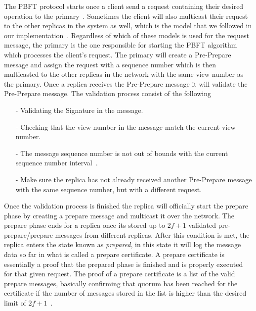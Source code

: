 The PBFT protocol starts once a client send a request containing their desired operation to the primary~\cite[p.~4]{PAPER:OGPBFT}. Sometimes the client will also multicast their request to the other replicas in the system as well, which is the model that we followed in our implementation~\cites[p.~2]{PAPER:DPBFT}[p.~406]{PAPER:PBFTRecovery}[p.~258]{BOOK:BuildDepDistSyst}. Regardless of which of these models is used for the request message, the primary is the one responsible for starting the \acrshort{PBFT} algorithm which processes the client's request. The primary will create a Pre-Prepare message and assign the request with a sequence number which is then multicasted to the other replicas in the network with the same view number as the primary. Once a replica receives the Pre-Prepare message it will validate the Pre-Prepare message. The validation process consist of the following~\cites[p.~4]{PAPER:OGPBFT} {SLIDES:PBFT}[p.~259]{BOOK:BuildDepDistSyst}
\begin{itemize}
	\item[-]Validating the Signature in the message.
	\item[-]Checking that the view number in the message match the current view number.
	\item[-]The message sequence number is not out of bounds with the current sequence number interval~\cites{SLIDES:PBFT}[p.~4]{PAPER:OGPBFT}.
	\item[-]Make sure the replica has not already received another Pre-Prepare message with the same sequence number, but with a different request.
\end{itemize} 
Once the validation process is finished the replica will officially start the prepare phase by creating a prepare message and multicast it over the network. The prepare phase ends for a replica once its stored up to $2f+1$ validated pre-prepare/prepare messages from different replicas. After this condition is met, the replica enters the state known as \emph{prepared}, in this state it will log the message data so far in what is called a prepare certificate. A prepare certificate is essentially a proof that the prepared phase is finished and is properly executed for that given request. The proof of a prepare certificate is a list of the valid prepare messages, basically confirming that quorum has been reached for the certificate if the number of messages stored in the list is higher than the desired limit of $2f + 1$~\cites[p.~408]{PAPER:PBFTRecovery}[p.~457]{BOOK:MVstandver3}. 
